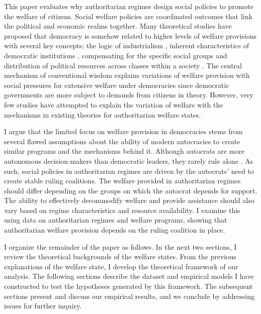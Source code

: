 \documentclass[12pt, letterpage, notitlepage]{article}
\begin{document}
This paper evaluates why authoritarian regimes design social policies to promote the welfare of citizens. Social welfare policies are coordinated outcomes that link the political and economic realms together. Many theoretical studies have proposed that democracy is somehow related to higher levels of welfare provisions \citep{Muller1988, Sirowy1990, Korpi1998} with several key concepts; the logic of industrialism \citep{Heclo1974, Wilensky1975, PrzeworskiandLimongi1993}, inherent characteristics of democratic institutions \citep{Muller1988, Pierson1996, Gerring2012}, compensating for the specific social groups \citep{Cameron1978, Rodrik1998, Burgoon2001a, Adsera2002} and distribution of political resources across classes within a society \citep{Gosta1989, Gosta1990, Korpi1998}. The central mechanism of conventional wisdom explains variations of welfare provision with social pressures for extensive welfare under democracies since democratic governments are more subject to demands from citizens in theory. However, very few studies have attempted to explain the variation of welfare with the mechanisms in existing theories for authoritarian welfare states.\par

I argue that the limited focus on welfare provision in democracies stems from several flawed assumptions about the ability of modern autocracies to create similar programs and the mechanisms behind it. Although autocrats are more autonomous decision-makers than democratic leaders, they rarely rule alone \citep{Gandhi2006, Frantz2014a}. As such, social policies in authoritarian regimes are driven by the autocrats’ need to create stable ruling coalitions. The welfare provided in authoritarian regimes should differ depending on the groups on which the autocrat depends for support. The ability to effectively decommodify welfare and provide assistance should also vary based on regime characteristics and resource availability. I examine this using data on authoritarian regimes and welfare programs, showing that authoritarian welfare provision depends on the ruling coalition in place.\par

I organize the remainder of the paper as follows. In the next two sections, I review the theoretical backgrounds of the welfare states. From the previous explanations of the welfare state, I develop the theoretical framework of our analysis. The following sections describe the dataset and empirical models I have constructed to test the hypotheses generated by this framework. The subsequent sections present and discuss our empirical results, and we conclude by addressing issues for further inquiry.
\end{document}
